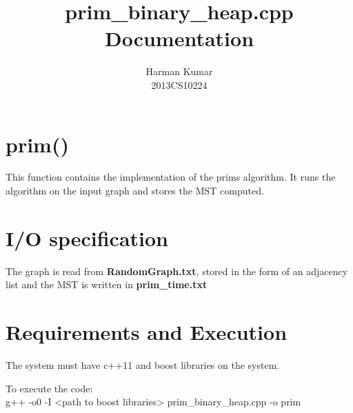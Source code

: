 \documentclass[]{article}
\begin{document}
\author{
		Harman Kumar\\
		2013CS10224		
		}

\title{prim\_binary\_heap.cpp Documentation}
\maketitle


\section{prim()}

\begin{flushleft}
	This function contains the implementation of the prims algorithm. It runs the algorithm on the input graph and stores the MST computed.
	
\end{flushleft} 



\section{I/O specification}

	The graph is read from \textbf{RandomGraph.txt}, stored in the form of an adjacency list and the MST is written in \textbf{prim\_time.txt} 

\section{Requirements and Execution}

The system must have c++11 and boost libraries on the system.

To execute the code:\\ 
g++ -o0 -I <path to boost libraries> prim\_binary\_heap.cpp -o prim
\end{document}
